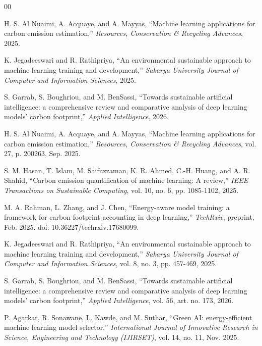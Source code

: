 \documentclass[conference]{IEEEtran}
\begin{document}
\begin{thebibliography}{00}
\setlength{\itemsep}{0pt}
\setlength{\parskip}{0pt}
\normalsize

 H. S. Al Nuaimi, A. Acquaye, and A. Mayyas, ``Machine learning 
applications for carbon emission estimation,'' \textit{Resources, Conservation 
\& Recycling Advances}, 2025.

 K. Jegadeeswari and R. Rathipriya, ``An environmental sustainable 
approach to machine learning training and development,'' \textit{Sakarya 
University Journal of Computer and Information Sciences}, 2025.

 S. Garrab, S. Boughriou, and M. BenSassi, ``Towards sustainable 
artificial intelligence: a comprehensive review and comparative analysis of 
deep learning models' carbon footprint,'' \textit{Applied Intelligence}, 2026.

 H. S. Al Nuaimi, A. Acquaye, and A. Mayyas, ``Machine learning 
applications for carbon emission estimation,'' \textit{Resources, Conservation 
\& Recycling Advances}, vol. 27, p. 200263, Sep. 2025.

 S. M. Hasan, T. Islam, M. Saifuzzaman, K. R. Ahmed, C.-H. Huang, 
and A. R. Shahid, ``Carbon emission quantification of machine learning: 
A review,'' \textit{IEEE Transactions on Sustainable Computing}, vol. 10, no. 6, 
pp. 1085-1102, 2025.

 M. A. Rahman, L. Zhang, and J. Chen, ``Energy-aware model training: 
a framework for carbon footprint accounting in deep learning,'' \textit{TechRxiv}, 
preprint, Feb. 2025. doi: 10.36227/techrxiv.17680099.

 K. Jegadeeswari and R. Rathipriya, ``An environmental sustainable 
approach to machine learning training and development,'' \textit{Sakarya 
University Journal of Computer and Information Sciences}, vol. 8, no. 3, 
pp. 457-469, 2025.

 S. Garrab, S. Boughriou, and M. BenSassi, ``Towards sustainable 
artificial intelligence: a comprehensive review and comparative analysis of 
deep learning models' carbon footprint,'' \textit{Applied Intelligence}, 
vol. 56, art. no. 173, 2026.

 P. Agarkar, R. Sonawane, L. Kawde, and M. Suthar, ``Green AI: 
energy-efficient machine learning model selector,'' \textit{International 
Journal of Innovative Research in Science, Engineering and Technology 
(IJIRSET)}, vol. 14, no. 11, Nov. 2025.

\end{thebibliography}
\end{document}
